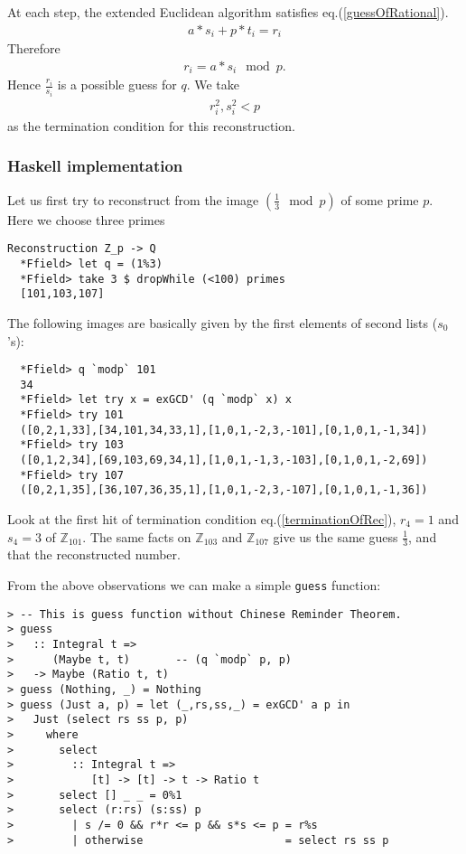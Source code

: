 \documentclass[11pt]{book}
\begin{document}
At each step, the extended Euclidean algorithm satisfies eq.(\ref{guessOfRational}).
\begin{eqnarray}
a*s_i + p*t_i = r_i
\end{eqnarray}
Therefore
\begin{eqnarray}
r_i = a*s_i \mod p. %
\end{eqnarray}
Hence $\frac{r_i}{s_i}$ is a possible guess for $q$.
We take
\begin{eqnarray}
\label{terminationOfRec}
r_i^2 , s_i^2 < p
\end{eqnarray}
as the termination condition for this reconstruction.

\subsubsection{Haskell implementation}
Let us first try to reconstruct from the image $(\frac{1}{3} \mod p)$ of some prime $p$.
Here we choose three primes
\begin{verbatim}
Reconstruction Z_p -> Q
  *Ffield> let q = (1%3)
  *Ffield> take 3 $ dropWhile (<100) primes
  [101,103,107]
\end{verbatim}
The following images are basically given by the first elements of second lists ($s_0$'s):
\begin{verbatim}  
  *Ffield> q `modp` 101
  34
  *Ffield> let try x = exGCD' (q `modp` x) x
  *Ffield> try 101
  ([0,2,1,33],[34,101,34,33,1],[1,0,1,-2,3,-101],[0,1,0,1,-1,34])
  *Ffield> try 103
  ([0,1,2,34],[69,103,69,34,1],[1,0,1,-1,3,-103],[0,1,0,1,-2,69])
  *Ffield> try 107
  ([0,2,1,35],[36,107,36,35,1],[1,0,1,-2,3,-107],[0,1,0,1,-1,36])  
\end{verbatim}
Look at the first hit of termination condition eq.(\ref{terminationOfRec}), $r_4=1$ and $s_4=3$ of $\mathbb{Z}_{101}$.
The same facts on $\mathbb{Z}_{103}$ and $\mathbb{Z}_{107}$ give us the same guess $\frac{1}{3}$, and that the reconstructed number.

From the above observations we can make a simple \verb+guess+ function:
\begin{verbatim}
> -- This is guess function without Chinese Reminder Theorem.
> guess 
>   :: Integral t => 
>      (Maybe t, t)       -- (q `modp` p, p)
>   -> Maybe (Ratio t, t)
> guess (Nothing, _) = Nothing
> guess (Just a, p) = let (_,rs,ss,_) = exGCD' a p in
>   Just (select rs ss p, p)
>     where
>       select 
>         :: Integral t => 
>            [t] -> [t] -> t -> Ratio t
>       select [] _ _ = 0%1
>       select (r:rs) (s:ss) p
>         | s /= 0 && r*r <= p && s*s <= p = r%s
>         | otherwise                      = select rs ss p
\end{verbatim}
\end{document}
